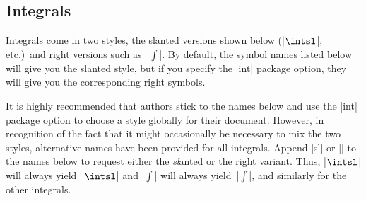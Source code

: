  \subsection{Integrals}
 \label{integrals}
 Integrals come in two styles, the slanted versions shown below (|$\intsl$|,
 etc.)\ and right versions such as~|$\int$|. By default, the symbol names
 listed below will give you the slanted style, but if you specify the |int|
 package option, they will give you the corresponding right symbols.

 It is highly recommended that authors stick to the names below and use the
 |int| package option to choose a style globally for their document.
 However, in recognition of the fact that it might occasionally be necessary
 to mix the two styles, alternative names have been provided for all
 integrals. Append |sl| or || to the names below to request either the
 \emph{sl}anted or the \emph{}right variant. Thus, |$\intsl$| will always
 yield~|$\intsl$| and |$\int$| will always yield~|$\int$|, and similarly for
 the other integrals.
%
 \begin{multicols}{2}
 \integralsymbol{}
 \integralsymbol{}
 \integralsymbol{}
 \integralsymbol{}
 \integralsymbol{}
 \integralsymbol{}
 \integralsymbol{}
 \integralsymbol{}
 \integralsymbol{}
 \integralsymbol{}
 \integralsymbol{}
 \integralsymbol{}
 \integralsymbol{}
 \integralsymbol{}
 \integralsymbol{}
 \integralsymbol{}
 \integralsymbol{}
 \integralsymbol{}
 \integralsymbol{}
 \integralsymbol{}
 \integralsymbol{}
 \integralsymbol{}
 \integralsymbol{}
 \integralsymbol{}
 \end{multicols}

\endinput
